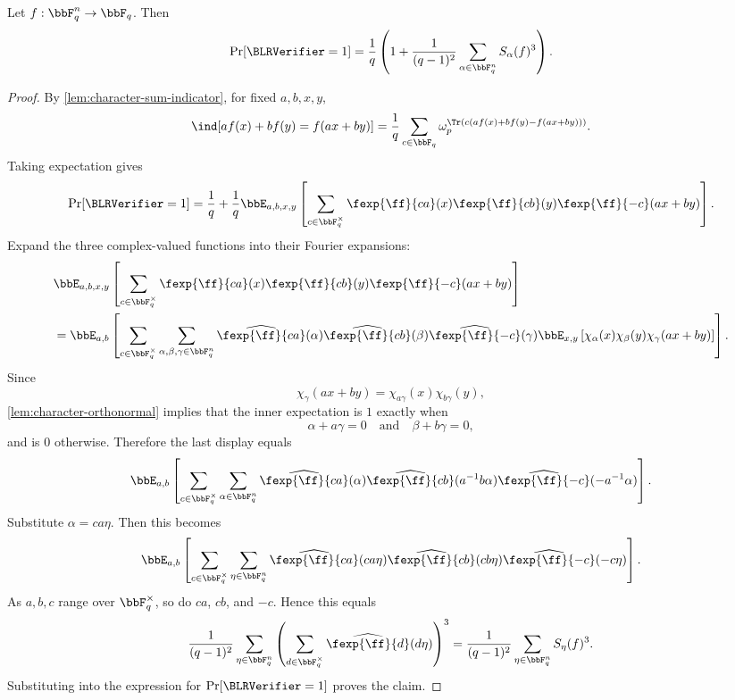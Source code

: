 \begin{lemma}
\label{lem:exact-blr-acceptance}
\leanok
Let $f:\bbF_q^n\to\bbF_q$.
Then
\[
    \Pr[\BLRVerifier=1]
    = \frac{1}{q}\left(1+\frac{1}{(q-1)^2}
        \sum_{\alpha\in\bbF_q^n} S_\alpha(f)^3
    \right).
\]
\end{lemma}

\begin{proof}\leanok
By \cref{lem:character-sum-indicator}, for fixed $a,b,x,y$,
\[
    \ind[a f(x)+b f(y)=f(ax+by)]
    =\frac{1}{q}\sum_{c\in\bbF_q}
        \omega_p^{\Tr(c(a f(x)+b f(y)-f(ax+by)))}.
\]
Taking expectation gives
\[
    \Pr[\BLRVerifier=1]
    =\frac{1}{q}+\frac{1}{q}\bbE_{a,b,x,y}
        \left[\sum_{c\in\bbF_q^\times}
        \fexp{\ff}{ca}(x)\fexp{\ff}{cb}(y)
        \fexp{\ff}{-c}(ax+by)
        \right].
\]
Expand the three complex-valued functions into their Fourier expansions:
\begin{align*}
&\bbE_{a,b,x,y}
        \left[\sum_{c\in\bbF_q^\times}
        \fexp{\ff}{ca}(x)\fexp{\ff}{cb}(y)
        \fexp{\ff}{-c}(ax+by)
        \right] \\
&=\bbE_{a,b}\left[\sum_{c\in\bbF_q^\times}
    \sum_{\alpha,\beta,\gamma\in\bbF_q^n}
    \widehat{\fexp{\ff}{ca}}(\alpha)
    \widehat{\fexp{\ff}{cb}}(\beta)
    \widehat{\fexp{\ff}{-c}}(\gamma)
    \bbE_{x,y}\left[
        \chi_\alpha(x)\chi_\beta(y)\chi_\gamma(ax+by)
    \right]
\right].
\end{align*}
Since
\[
    \chi_\gamma(ax+by)=\chi_{a\gamma}(x)\chi_{b\gamma}(y),
\]
\cref{lem:character-orthonormal} implies that the inner expectation is $1$ exactly when
\[
    \alpha+a\gamma=0
    \quad\text{and}\quad
    \beta+b\gamma=0,
\]
and is $0$ otherwise. Therefore the last display equals
\[
    \bbE_{a,b}\left[\sum_{c\in\bbF_q^\times}
    \sum_{\alpha\in\bbF_q^n}
    \widehat{\fexp{\ff}{ca}}(\alpha)
    \widehat{\fexp{\ff}{cb}}(a^{-1}b\alpha)
    \widehat{\fexp{\ff}{-c}}(-a^{-1}\alpha)
    \right].
\]
Substitute $\alpha=ca\eta$. Then this becomes
\[
    \bbE_{a,b}\left[\sum_{c\in\bbF_q^\times}
    \sum_{\eta\in\bbF_q^n}
    \widehat{\fexp{\ff}{ca}}(ca\eta)
    \widehat{\fexp{\ff}{cb}}(cb\eta)
    \widehat{\fexp{\ff}{-c}}(-c\eta)
    \right].
\]
As $a,b,c$ range over $\bbF_q^\times$, so do $ca$, $cb$, and $-c$. Hence this equals
\[
    \frac{1}{(q-1)^2}
    \sum_{\eta\in\bbF_q^n}
    \left(\sum_{d\in\bbF_q^\times}
        \widehat{\fexp{\ff}{d}}(d\eta)
    \right)^3
    =\frac{1}{(q-1)^2}\sum_{\eta\in\bbF_q^n}S_\eta(f)^3.
\]
Substituting into the expression for $\Pr[\BLRVerifier=1]$ proves the claim.
\end{proof}

